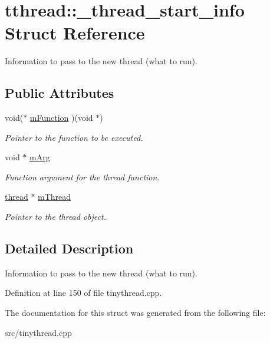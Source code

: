 \hypertarget{structtthread_1_1__thread__start__info}{}\section{tthread\+:\+:\+\_\+thread\+\_\+start\+\_\+info Struct Reference}
\label{structtthread_1_1__thread__start__info}


Information to pass to the new thread (what to run).  


\subsection*{Public Attributes}
\begin{DoxyCompactItemize}
\item 
void($\ast$ \hyperlink{structtthread_1_1__thread__start__info_a355ad608cc4b38211d7fe4f30f54824f}{m\+Function} )(void $\ast$)\hypertarget{structtthread_1_1__thread__start__info_a355ad608cc4b38211d7fe4f30f54824f}{}\label{structtthread_1_1__thread__start__info_a355ad608cc4b38211d7fe4f30f54824f}

\begin{DoxyCompactList}\small\item\em Pointer to the function to be executed. \end{DoxyCompactList}\item 
void $\ast$ \hyperlink{structtthread_1_1__thread__start__info_ab02bdb937cdc65e34a38c1c03afde3c9}{m\+Arg}\hypertarget{structtthread_1_1__thread__start__info_ab02bdb937cdc65e34a38c1c03afde3c9}{}\label{structtthread_1_1__thread__start__info_ab02bdb937cdc65e34a38c1c03afde3c9}

\begin{DoxyCompactList}\small\item\em Function argument for the thread function. \end{DoxyCompactList}\item 
\hyperlink{classtthread_1_1thread}{thread} $\ast$ \hyperlink{structtthread_1_1__thread__start__info_a7556ec01ce2f503e218b8bd18600f6ed}{m\+Thread}\hypertarget{structtthread_1_1__thread__start__info_a7556ec01ce2f503e218b8bd18600f6ed}{}\label{structtthread_1_1__thread__start__info_a7556ec01ce2f503e218b8bd18600f6ed}

\begin{DoxyCompactList}\small\item\em Pointer to the thread object. \end{DoxyCompactList}\end{DoxyCompactItemize}


\subsection{Detailed Description}
Information to pass to the new thread (what to run). 

Definition at line 150 of file tinythread.\+cpp.



The documentation for this struct was generated from the following file\+:\begin{DoxyCompactItemize}
\item 
src/tinythread.\+cpp\end{DoxyCompactItemize}
